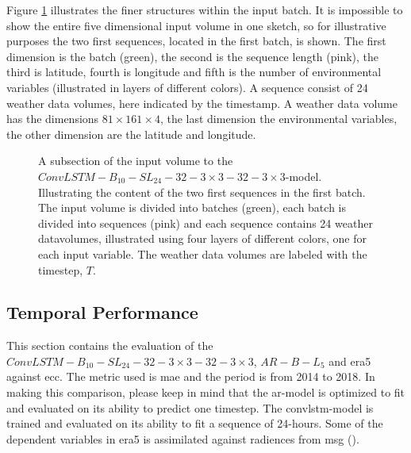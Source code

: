 Figure \ref{fig:input_volume_conv_lstm} illustrates the finer structures within the input batch. It is impossible to show the entire five dimensional input volume in one sketch, so for illustrative purposes the two first sequences, located in the first batch, is shown. The first dimension is the batch (green), the second is the sequence length (pink), the third is latitude, fourth is longitude and fifth is the number of environmental variables (illustrated in layers of different colors). A sequence consist of 24 weather data volumes, here indicated by the timestamp. A weather data volume has the dimensions $81\times161\times4$, the last dimension the environmental variables, the other dimension are the latitude and longitude. 
\begin{figure}
    \centering
    
    \caption{A subsection of the input volume to the $ConvLSTM-B_{10}-SL_{24}-32-3\times3-32-3 \times3$-model. Illustrating the content of the two first sequences in the first batch. The input volume is divided into batches (green), each batch is divided into sequences (pink) and each sequence contains 24 weather datavolumes, illustrated using four layers of different colors, one for each input variable. The weather data volumes are labeled with the timestep, $T$.}
    \label{fig:input_volume_conv_lstm}
\end{figure}


\subsection{Temporal Performance}
This section contains the evaluation of the $ConvLSTM-B_{10}-SL_{24}-32-3\times3-32-3 \times3$, $AR-B-L_5$ and \acrshort{era5} against \acrshort{ecc}. The metric used is \acrshort{mae} and the period is from 2014 to 2018. In making this comparison, please keep in mind that the \acrshort{ar}-model is optimized to fit and evaluated on its ability to predict one timestep. The \acrshort{convlstm}-model is trained and evaluated on its ability to fit a sequence of 24-hours. Some of the dependent variables in \acrshort{era5} is assimilated against radiences from \acrshort{msg} (\cite{ERA52020}).



